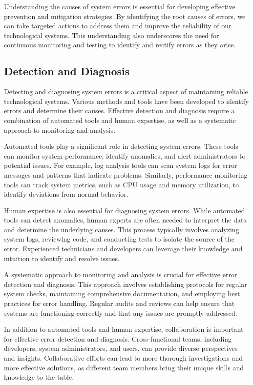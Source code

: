 \documentclass[10pt, conference, letterpaper]{IEEEtran}
\begin{document}
Understanding the causes of system errors is essential for developing effective prevention and mitigation strategies. By identifying the root causes of errors, we can take targeted actions to address them and improve the reliability of our technological systems. This understanding also underscores the need for continuous monitoring and testing to identify and rectify errors as they arise.

\subsection{Detection and Diagnosis}
Detecting and diagnosing system errors is a critical aspect of maintaining reliable technological systems. Various methods and tools have been developed to identify errors and determine their causes. Effective detection and diagnosis require a combination of automated tools and human expertise, as well as a systematic approach to monitoring and analysis.

Automated tools play a significant role in detecting system errors. These tools can monitor system performance, identify anomalies, and alert administrators to potential issues. For example, log analysis tools can scan system logs for error messages and patterns that indicate problems. Similarly, performance monitoring tools can track system metrics, such as CPU usage and memory utilization, to identify deviations from normal behavior.

Human expertise is also essential for diagnosing system errors. While automated tools can detect anomalies, human experts are often needed to interpret the data and determine the underlying causes. This process typically involves analyzing system logs, reviewing code, and conducting tests to isolate the source of the error. Experienced technicians and developers can leverage their knowledge and intuition to identify and resolve issues.

A systematic approach to monitoring and analysis is crucial for effective error detection and diagnosis. This approach involves establishing protocols for regular system checks, maintaining comprehensive documentation, and employing best practices for error handling. Regular audits and reviews can help ensure that systems are functioning correctly and that any issues are promptly addressed.

In addition to automated tools and human expertise, collaboration is important for effective error detection and diagnosis. Cross-functional teams, including developers, system administrators, and users, can provide diverse perspectives and insights. Collaborative efforts can lead to more thorough investigations and more effective solutions, as different team members bring their unique skills and knowledge to the table.
\end{document}
